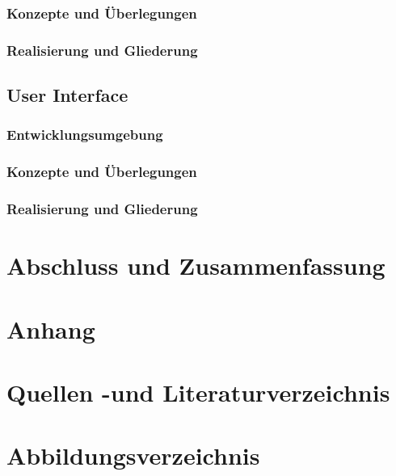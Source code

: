 \documentclass[11pt]{article}
\begin{document}
\subsubsection{Konzepte und Überlegungen}
\subsubsection{Realisierung und Gliederung}

\subsection{User Interface}
\subsubsection{Entwicklungsumgebung}
\subsubsection{Konzepte und Überlegungen}
\subsubsection{Realisierung und Gliederung}


\section{Abschluss und Zusammenfassung}


\section{Anhang}
\section{Quellen -und Literaturverzeichnis}
\section{Abbildungsverzeichnis}
\end{document}
